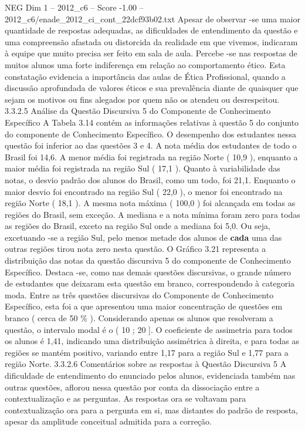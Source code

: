 \begin{textsample}{NEG Dim 1 – 2012\_c6 – Score -1.00 – 2012\_c6/enade\_2012\_ci\_cont\_22dcf93b02.txt}
Apesar de observar -se uma maior quantidade de respostas adequadas, as dificuldades de entendimento da questão e uma compreensão afastada ou distorcida da realidade em que vivemos, indicaram à equipe que muito precisa ser feito em sala de aula.
Percebe -se nas respostas de muitos alunos uma forte indiferença em relação ao comportamento ético.
Esta constatação evidencia a importância das aulas de Ética Profissional, quando a discussão aprofundada de valores éticos e sua prevalência diante de quaisquer que sejam os motivos ou fins alegados por quem não os atendeu ou desrespeitou. 3.3.2.5 Análise da Questão Discursiva 5 do Componente de Conhecimento Específico A Tabela 3.14 contém as informações relativas à questão 5 do conjunto do componente de Conhecimento Específico.
O desempenho dos estudantes nessa questão foi inferior ao das questões 3 e 4.
A nota média dos estudantes de todo o Brasil foi 14,6.
A menor média foi registrada na região Norte ( 10,9 ), enquanto a maior média foi registrada na região Sul ( 17,1 ).
Quanto à variabilidade das notas, o desvio padrão dos alunos do Brasil, como um todo, foi 21,1.
Enquanto o maior desvio foi encontrado na região Sul ( 22,0 ), o menor foi encontrado na região Norte ( 18,1 ).
A mesma nota máxima ( 100,0 ) foi alcançada em todas as regiões do Brasil, sem exceção.
A mediana e a nota mínima foram zero para todas as regiões do Brasil, exceto na região Sul onde a mediana foi 5,0.
Ou seja, excetuando -se a região Sul, pelo menos metade dos alunos de \textbf{cada} uma das outras regiões tirou nota zero nesta questão.
O Gráfico 3.21 representa a distribuição das notas da questão discursiva 5 do componente de Conhecimento Específico.
Destaca -se, como nas demais questões discursivas, o grande número de estudantes que deixaram esta questão em branco, correspondendo à categoria moda.
Entre as três questões discursivas do Componente de Conhecimento Específico, esta foi a que apresentou uma maior concentração de questões em branco ( cerca de 50 \% ).
Considerando apenas os alunos que resolveram a questão, o intervalo modal é o ( 10 ; 20 ].
O coeficiente de assimetria para todos os alunos é 1,41, indicando uma distribuição assimétrica à direita, e para todas as regiões se mantém positivo, variando entre 1,17 para a região Sul e 1,77 para a região Norte. 3.3.2.6 Comentários sobre as respostas à Questão Discursiva 5 A dificuldade de entendimento do enunciado pelos alunos, evidenciada também nas outras questões, aflorou nessa questão por conta da dissociação entre a contextualização e as perguntas.
As respostas ora se voltavam para contextualização ora para a pergunta em si, mas distantes do padrão de resposta, apesar da amplitude conceitual admitida para a correção.

\end{textsample}
